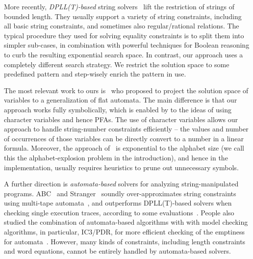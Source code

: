 \documentclass[sigplan,review,anonymous]{acmart}\settopmatter{printfolios=true,printccs=false,printacmref=false}
\begin{document}
More recently,  {\it DPLL(T)-based} string solvers~\cite{berzish2017z3str3,zheng2017z3str2,cvc4Tool,trinh2014s3,trinh2016progressive,abdulla2015norn,abdulla2018trau,sloth,chen2019decision} lift the
restriction of strings of bounded length. They usually support a variety of string constraints, including all basic string constraints, and sometimes also regular/rational relations. 
The typical procedure they used for solving equality constraints is to split them into simpler sub-cases, in combination with powerful techniques for Boolean reasoning to curb the resulting exponential search space. In contrast, our approach uses a completely different search strategy. We restrict the solution space to some predefined pattern and step-wisely enrich the pattern in use.

The most relevant work to ours is~\cite{abdulla2018trau} who proposed to project the solution space of variables to a generalization of flat automata. The main difference is that our approach works fully symbolically, which is enabled by to the ideas of using character variables and hence PFAs. The use of character variables allows our approach to handle string-number constraints efficiently -- the values and number of occurrences of those variables can be directly convert to a number in a linear formula. Moreover, the approach of~\cite{abdulla2018trau} is exponential to the alphabet size (we call this the alphabet-explosion problem in the introduction), and hence in the implementation, usually requires heuristics to prune out unnecessary symbols. 

A further direction is {\it automata-based} solvers for analyzing
string-manipulated programs. ABC~\cite{aydin2018parameterized} and Stranger~\cite{yu2010stranger} soundly over-approximates string constraints using multi-tape automata~\cite{yu2016optimal}, and outperforms DPLL(T)-based solvers when checking single execution traces, according to some evaluations~\cite{kausler2014evaluation}. People also studied the combination of automata-based algorithms with with model checking
algorithms, in particular, IC3/PDR, for more efficient checking of the emptiness for automata~\cite{wang2016string,sloth}. However, many kinds of constraints, including length constraints and word equations, cannot be entirely handled by automata-based solvers. 
\end{document}
